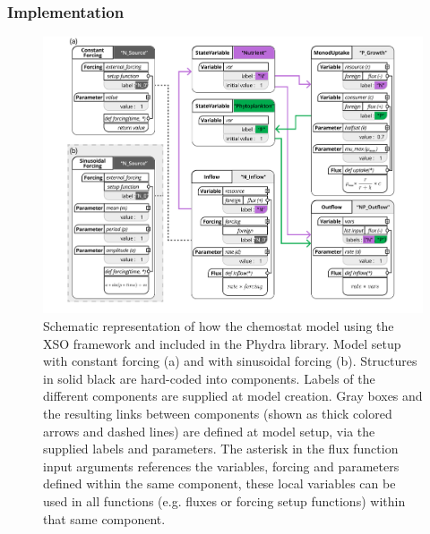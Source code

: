 \documentclass[journal abbreviation, manuscript]{copernicus}
\begin{document}
\subsubsection{Implementation}

\begin{figure}[t]
\includegraphics[width=15cm]{Figures/firstdraft_schematics/code_schematics/Chemostat.pdf}
\caption{Schematic representation of how the chemostat model using the XSO framework and included in the Phydra library. Model setup with constant forcing (a) and with sinusoidal forcing (b). Structures in solid black are hard-coded into components. Labels of the different components are supplied at model creation. Gray boxes and the resulting links between components (shown as thick colored arrows and dashed lines) are defined at model setup, via the supplied labels and parameters. The asterisk in the flux function input arguments references the variables, forcing and parameters defined within the same component, these local variables can be used in all functions (e.g. fluxes or forcing setup functions) within that same component.}
\label{Figure:CodeSchematics_1}
\end{figure}
\end{document}
